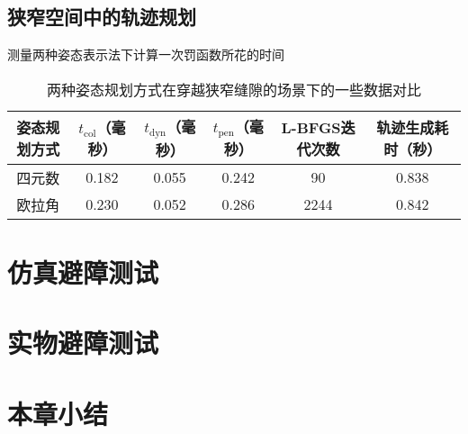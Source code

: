 \subsection{狭窄空间中的轨迹规划}\label{subsec:planning_in_narrow_env}

测量两种姿态表示法下计算一次罚函数所花的时间

\begin{table}[htbp]
    \caption{两种姿态规划方式在穿越狭窄缝隙的场景下的一些数据对比\label{tab:comparison_in_narrow_gap_scenario}}
    \vspace{0.5em}\centering\wuhao
    \begin{tabular}{cccccc}
    \toprule[1.5pt]
    姿态规划方式 & $t_{\text{col}}$（毫秒） & $t_{\text{dyn}}$（毫秒）& $t_{\text{pen}}$（毫秒）& L-BFGS迭代次数 & 轨迹生成耗时（秒）\\
    \midrule[1pt]
    四元数 & 0.182 & 0.055 & 0.242 & 90 & 0.838 \\
    欧拉角 & 0.230 & 0.052 & 0.286 & 2244 & 0.842\\
    \bottomrule[1.5pt]
    \end{tabular}
\end{table}

\section{仿真避障测试}\label{sec:simulation_experiments}


\section{实物避障测试}\label{sec:real_world_experiments}

\section{本章小结}\label{sec:summary_5}
